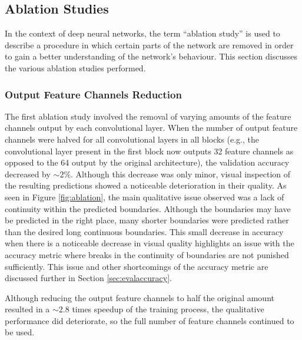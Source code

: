 \subsection{Ablation Studies}
\label{sec:evalablation}

In the context of deep neural networks, the term “ablation study” is used to describe a procedure in which certain parts of the network are removed in order to gain a better understanding of the network's behaviour. This section discusses the various ablation studies performed.

\subsubsection{Output Feature Channels Reduction}

The first ablation study involved the removal of varying amounts of the feature channels output by each convolutional layer. When the number of output feature channels were halved for all convolutional layers in all blocks (e.g., the convolutional layer present in the first block now outputs 32 feature channels as opposed to the 64 output by the original architecture), the validation accuracy decreased by ${\sim}2\%$. Although this decrease was only minor, visual inspection of the resulting predictions showed a noticeable deterioration in their quality. As seen in Figure \ref{fig:ablation}, the main qualitative issue observed was a lack of continuity within the predicted boundaries. Although the boundaries may have be predicted in the right place, many shorter boundaries were predicted rather than the desired long continuous boundaries. This small decrease in accuracy when there is a noticeable decrease in visual quality highlights an issue with the accuracy metric where breaks in the continuity of boundaries are not punished sufficiently. This issue and other shortcomings of the accuracy metric are discussed further in Section \ref{sec:evalaccuracy}.

Although reducing the output feature channels to half the original amount resulted in a ${\sim}$2.8 times speedup of the training process, the qualitative performance did deteriorate, so the full number of feature channels continued to be used.

